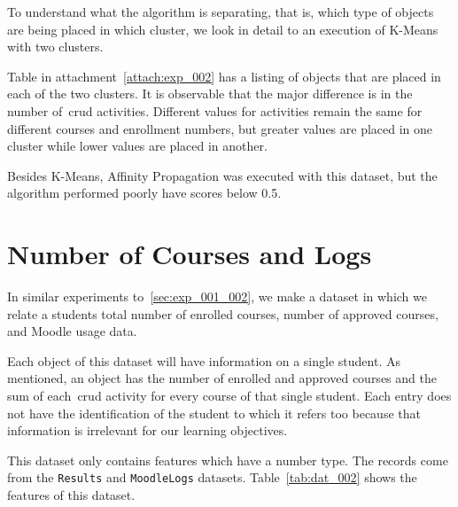 To understand what the algorithm is separating, that is, which type of objects
are being placed in which cluster, we look in detail to an execution of K-Means
with two clusters.

Table in attachment~\ref{attach:exp_002} has a listing of objects that are
placed in each of the two clusters. It is observable that the major difference
is in the number of~\gls{crud} activities. Different values for activities
remain the same for different courses and enrollment numbers, but greater
values are placed in one cluster while lower values are placed in another.

Besides K-Means, Affinity Propagation was executed with this dataset, but the
algorithm performed poorly have scores below 0.5.

\section{Number of Courses and Logs}
\label{sec:exp_003_004}

In similar experiments to~\ref{sec:exp_001_002}, we make a dataset in which we
relate a students total number of enrolled courses,  number of approved
courses, and Moodle usage data.

Each object of this dataset will have information on a single student. As
mentioned, an object has the number of enrolled and approved courses and the
sum of each~\gls{crud} activity for every course of that single student. Each
entry does not have the identification of the student to which it refers too
because that information is irrelevant for our learning objectives.

This dataset only contains features which have a number type. The records come
from the \texttt{Results} and \texttt{MoodleLogs} datasets.
Table~\ref{tab:dat_002} shows the features of this dataset.

